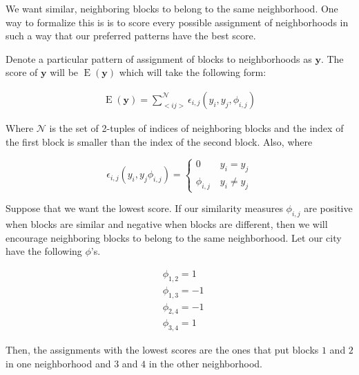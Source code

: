 We want similar, neighboring blocks to belong to the same
neighborhood. One way to formalize this is is to score every possible
assignment of neighborhoods in such a way that our preferred patterns
have the best score.

Denote a particular pattern of assignment of blocks to neighborhoods
as $\mathbf{y}$.  The score of $\mathbf{y}$ will be
$\operatorname{E}(\mathbf{y})$ which will take the following form:

\begin{align}
\operatorname{E}(\mathbf{y}) = \sum_{<i j>}^{\mathcal{N}}\epsilon_{i,j}(y_i,y_j,\phi_{i,j})
\end{align}

Where $\mathcal{N}$ is the set of 2-tuples of indices of neighboring
blocks and the index of the first block is smaller than the index of
the second block. Also, where

\begin{equation}
\epsilon_{i,j}(y_i,y_j\phi_{i,j}) = \begin{cases}
  0 \quad\quad y_i = y_j \\
  \phi_{i,j} \quad y_i \neq y_j
\end{cases}
\end{equation}

Suppose that we want the lowest score. If our similarity
measures $\phi_{i,j}$ are positive when blocks are similar and negative
when blocks are different, then we will encourage neighboring blocks to
belong to the same neighborhood. Let our city have the
following $\phi$'s.

\begin{align*}
&\phi_{1,2} = 1 \\
&\phi_{1,3} = -1 \\
&\phi_{2,4} = -1 \\
&\phi_{3,4} = 1
\end{align*} 

Then, the assignments with the lowest scores are the ones that put
blocks $1$ and $2$ in one neighborhood and $3$ and $4$ in the other
neighborhood.

\begin{figure}[!h]
\centering


\end{figure}

